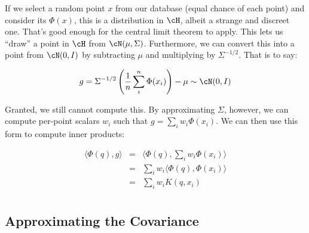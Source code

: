 \documentclass[twoside,11pt]{homework}
\begin{document}
\begin{multicols}{2}
If we select a random point $x$ from our database (equal chance of
each point) and consider its $\Phi(x)$, this is a distribution in
$\cH$, albeit a strange and discreet one.  That's good enough for the
central limit theorem to apply.  This lets us ``draw'' a point in
$\cH$ from $\cN(\mu,\Sigma)$.  Furthermore, we can convert this into a
point from $\cN(0,I)$ by subtracting $\mu$ and multiplying by
$\Sigma^{-1/2}$.  That is to say:

\begin{equation*}
  g = \Sigma^{-1/2}\left(\frac{1}{n}\sum_i^n \Phi(x_i) \right) - \mu  \sim \cN(0,I)
\end{equation*}

Granted, we still cannot compute this.  By approximating $\Sigma$,
however, we can compute per-point scalars $w_i$ such that $g=\sum_i
w_i\Phi(x_i)$.  We can then use this form to compute
inner products:

\begin{eqnarray*}
  \langle \Phi(q), g \rangle
  & = & \langle \Phi(q), \sum_i w_i\Phi(x_i) \rangle \\
  & = & \sum_i w_i \langle \Phi(q), \Phi(x_i) \rangle \\
  & = & \sum_i w_i K(q, x_i) \\
\end{eqnarray*}



\subsection{Approximating the Covariance} %


\end{multicols}
\end{document}
